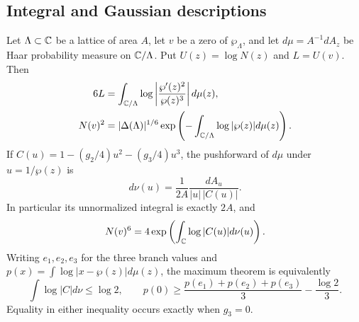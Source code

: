 
\subsection{Integral and Gaussian descriptions}

\begin{statement}
Let $\Lambda\subset\mathbb C$ be a lattice of area $A$, let $v$ be a zero
of $\wp_\Lambda$, and let $d\mu=A^{-1}dA_z$ be Haar probability
measure on $\mathbb C/\Lambda$. Put $U(z)=\log N(z)$ and
$L=U(v)$. Then
\begin{align}
 6L&=\int_{\mathbb C/\Lambda}\log\left|\frac{\wp'(z)^2}{\wp(z)^3}\right|d\mu(z),
 \label{eq:ca-mahler}\\
 N(v)^2&=|\Delta(\Lambda)|^{1/6}
      \exp\left(-\int_{\mathbb C/\Lambda}\log|\wp(z)|d\mu(z)\right).
 \label{eq:ca-wpmean}
\end{align}
If $C(u)=1-(g_2/4)u^2-(g_3/4)u^3$, the pushforward of $d\mu$
under $u=1/\wp(z)$ is
\begin{equation}\label{eq:ca-nu}
 d\nu(u)=\frac1{2A}\frac{dA_u}{|u|\,|C(u)|}.
\end{equation}
In particular its unnormalized integral is exactly $2A$, and
\[
 N(v)^6=4\exp\left(\int_{\mathbb C}\log|C(u)|d\nu(u)\right).
\]
Writing $e_1,e_2,e_3$ for the three branch values and
$p(x)=\int\log|x-\wp(z)|d\mu(z)$, the maximum theorem is equivalently
\[
 \int\log|C|d\nu\leq\log2,\qquad
 p(0)\geq\frac{p(e_1)+p(e_2)+p(e_3)}3-\frac{\log2}3.
\]
Equality in either inequality occurs exactly when $g_3=0$.
\end{statement}

